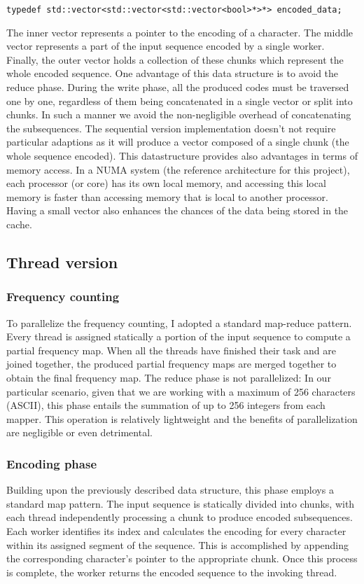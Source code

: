 \documentclass{article}
\begin{document}
\begin{verbatim}
typedef std::vector<std::vector<std::vector<bool>*>*> encoded_data;
\end{verbatim}

The inner vector represents a
pointer to the encoding of a character. The middle vector
represents a part of the input sequence encoded by a single worker.
Finally, the outer vector holds a collection of these chunks which represent
the whole encoded sequence.
One advantage of this data structure is to avoid the reduce phase.
During the write phase, all the produced codes must be traversed one by one, regardless
of them being concatenated in a single vector or split into chunks. In such a manner we
avoid the non-negligible overhead of concatenating the subsequences.
The sequential version implementation doesn't not require particular adaptions as it
will produce a vector composed of a single chunk (the whole sequence encoded).
This datastructure provides also advantages in terms of memory access.
In a NUMA system (the reference architecture for this project), each processor (or core) has its own local memory,
and accessing this local memory is faster than accessing memory that is local to another processor.
Having a small vector also enhances the chances of the data being stored in the cache.

\subsection{Thread version}
\subsubsection{Frequency counting}
To parallelize the frequency counting, I adopted a standard
map-reduce pattern. Every thread is assigned statically a portion of
the input sequence to compute a partial frequency map.
When all the threads have finished their task and are joined together,
the produced partial frequency maps are merged together to obtain the final
frequency map. The reduce phase is not parallelized:
In our particular scenario, given that we are working with a maximum of 256 characters (ASCII),
this phase entails the summation of up to 256 integers from each mapper.
This operation is relatively lightweight and the benefits of parallelization are negligible
or even detrimental.
\subsubsection{Encoding phase}
Building upon the previously described data structure, this phase employs a standard map pattern.
The input sequence is statically divided into chunks, with each thread independently processing a
chunk to produce encoded subsequences.
Each worker identifies its index and calculates the encoding for every character within
its assigned segment of the sequence. This is accomplished by appending the corresponding
character's pointer to the appropriate chunk. Once this process is complete, the worker returns
the encoded sequence to the invoking thread.
\end{document}
